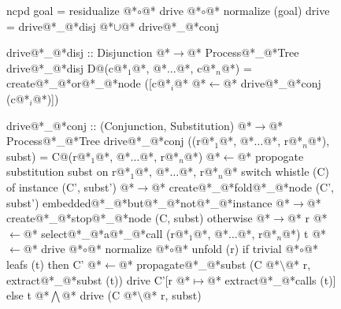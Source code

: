 \documentclass[12pt,a4paper]{report}
\begin{document}
\thispagestyle{empty}
\begin{figure}[h]
\begin{PseudoCode}[moredelim={[is][stringstyle]{@@}{@@}},
  moredelim={[is][\color{dkgreen}\bfseries]{@!}{@!}},
  moredelim={[is][\color{red}\bfseries]{!!}{!!}}]
ncpd goal = residualize @*$\circ$@* drive @*$\circ$@* normalize (goal)
drive     = drive@*\_@*disj @*$\cup$@* drive@*\_@*conj

drive@*\_@*disj :: Disjunction @*$\to$@* Process@*\_@*Tree
drive@*\_@*disj D@(c@*$_1$@*, @*$\dots$@*, c@*$_n$@*) =
  create@*\_@*or@*\_@*node ([c@*$_i$@* @*$\leftarrow$@* drive@*\_@*conj (c@*$_i$@*)])

drive@*\_@*conj :: (Conjunction, Substitution) @*$\to$@* Process@*\_@*Tree
drive@*\_@*conj ((r@*$_1$@*, @*$\dots$@*, r@*$_n$@*), subst) =
  C@(r@*$_1$@*, @*$\dots$@*, r@*$_n$@*) @*$\leftarrow$@* propogate substitution subst on r@*$_1$@*, @*$\dots$@*, r@*$_n$@*
  switch whistle (C) of
    instance (C', subst')      @*$\to$@* create@*\_@*fold@*\_@*node (C', subst')
    embedded@*\_@*but@*\_@*not@*\_@*instance @*$\to$@* create@*\_@*stop@*\_@*node (C, subst)
    otherwise @*$\to$@*
      r @*$\leftarrow$@* select@*\_@*a@*\_@*call (r@*$_1$@*, @*$\dots$@*, r@*$_n$@*)
      t @*$\leftarrow$@* drive @*$\circ$@* normalize @*$\circ$@* unfold (r)
      if trivial @*$\circ$@* leafs (t)
      then
        C' @*$\leftarrow$@* propagate@*\_@*subst (C @*$\setminus$@* r, extract@*\_@*subst (t))
        drive C'[r @*$\mapsto$@* extract@*\_@*calls (t)]
      else
        t @*$\bigwedge$@* drive (C @*$\setminus$@* r, subst)
\end{PseudoCode}
\end{figure}
\end{document}
